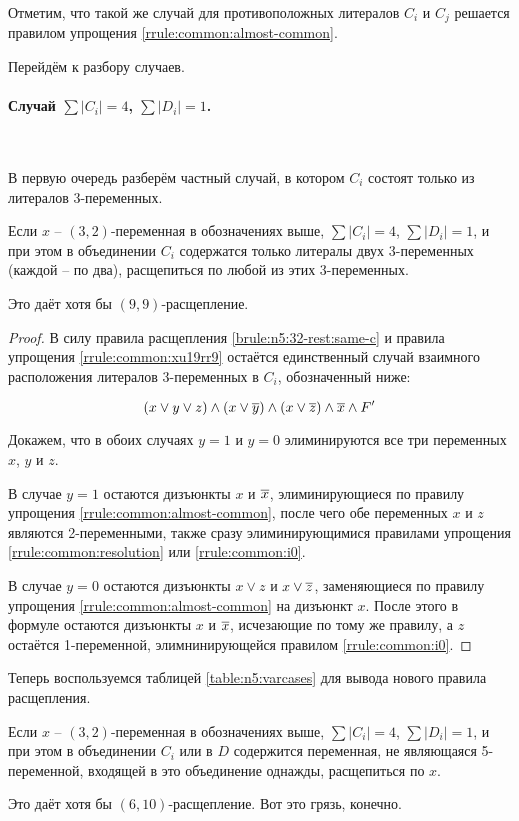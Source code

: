 Отметим, что такой же случай для противоположных литералов $C_i$ и $C_j$ решается правилом упрощения \ref{rrule:common:almost-common}.

Перейдём к разбору случаев.

\paragraph{Случай $\sum |C_i| = 4$, $\sum |D_i| = 1$.}~

В первую очередь разберём частный случай, в котором $C_i$ состоят только из литералов 3-переменных.

\begin{brule}
 Если $x$ -- $(3,2)$-переменная в обозначениях выше, $\sum |C_i| = 4$, $\sum |D_i| = 1$, и при этом в объединении $C_i$ содержатся только литералы двух 3-переменных (каждой -- по два), расщепиться по любой из этих 3-переменных.

 Это даёт хотя бы $(9,9)$-расщепление.
 \label{brule:n5:32-rest:c4:3v}
\end{brule}

\begin{proof}
 В силу правила расщепления \ref{brule:n5:32-rest:same-c} и правила упрощения \ref{rrule:common:xu19rr9} остаётся единственный случай взаимного расположения литералов 3-переменных в $C_i$, обозначенный ниже:

 $$
  (x \vee y \vee z) \wedge (x \vee \overline{y}) \wedge (x \vee \overline{z}) \wedge \overline{x} \wedge F'
 $$

 Докажем, что в обоих случаях $y = 1$ и $y = 0$ элиминируются все три переменных $x$, $y$ и $z$.

 В случае $y = 1$ остаются дизъюнкты $x$ и $\overline{x}$, элиминирующиеся по правилу упрощения \ref{rrule:common:almost-common}, после чего обе переменных $x$ и $z$ являются 2-переменными, также сразу элиминирующимися правилами упрощения \ref{rrule:common:resolution} или \ref{rrule:common:i0}.

 В случае $y = 0$ остаются дизъюнкты $x \vee z$ и $x \vee \overline{z}$, заменяющиеся по правилу упрощения \ref{rrule:common:almost-common} на дизъюнкт $x$. После этого в формуле остаются дизъюнкты $x$ и $\overline{x}$, исчезающие по тому же правилу, а $z$ остаётся 1-переменной, элимнинирующейся правилом \ref{rrule:common:i0}.
\end{proof}

Теперь воспользуемся таблицей \ref{table:n5:varcases} для вывода нового правила расщепления.

\begin{brule}
 Если $x$ -- $(3,2)$-переменная в обозначениях выше, $\sum |C_i| = 4$, $\sum |D_i| = 1$, и при этом в объединении $C_i$ или в $D$ содержится переменная, не являющаяся 5-переменной, входящей в это объединение однажды, расщепиться по $x$.

 Это даёт хотя бы $(6,10)$-расщепление.
{\color{white} Вот это грязь, конечно.}
 \label{brule:n5:32-rest:c4:not-5v}
\end{brule}


